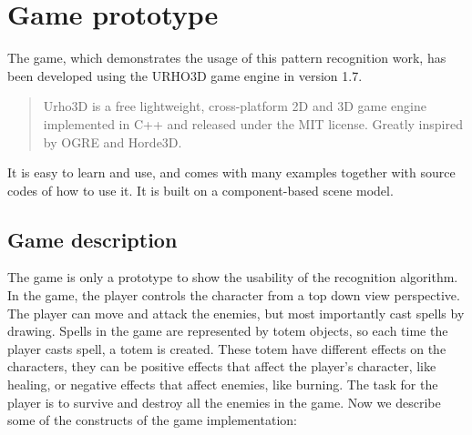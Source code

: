 \section{Game prototype}
The game, which demonstrates the usage of this pattern recognition work, has been developed using the URHO3D game engine in version 1.7. \begin{quotation} Urho3D is a free lightweight, cross-platform 2D and 3D game engine implemented in C++ and released under the MIT license. Greatly inspired by OGRE and Horde3D. \end{quotation} It is easy to learn and use, and comes with many examples together with source codes of how to use it. It is built on a component-based scene model. 

\subsection{Game description}
The game is only a prototype to show the usability of the recognition algorithm. In the game, the player controls the character from a top down view perspective. The player can move and attack the enemies, but most importantly cast spells by drawing. Spells in the game are represented by totem objects, so each time the player casts spell, a totem is created. These totem have different effects on the characters, they can be positive effects that affect the player's character, like healing, or negative effects that affect enemies, like burning. The task for the player is to survive and destroy all the enemies in the game. Now we describe some of the constructs of the game implementation:

